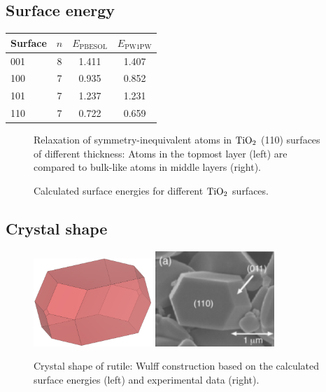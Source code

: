 \documentclass[a4paper,12pt]{scrartcl}
\begin{document}
\subsection{Surface energy}
%
\begin{table}[H]
	\centering
	\label{tab:tio2-pw1pw-compare}
	\begin{tabular}{lccc}
		\toprule
		Surface & $n$ & $ E_\mathrm{PBESOL}$ & $ E_\mathrm{PW1PW} $ \\
		\midrule
		001       & 8 & 1.411     & 1.407    \\
		100     & 7 & 0.935     & 0.852    \\
		101     & 7 & 1.237     & 1.231    \\
		110     & 7 & 0.722     & 0.659    \\
		\bottomrule
	\end{tabular}
\end{table}
%
\begin{figure}[H]
	\centering
	
	\vspace{-20pt}
	\caption{Relaxation of symmetry-inequivalent atoms in $ \ce{TiO2} $ (110) surfaces of different thickness: Atoms in the topmost layer (left) are compared to bulk-like atoms in middle layers (right).}
	\label{fig:dz}
\end{figure}
%
\begin{figure}[H]
	\centering
	
	\vspace{-20pt}
	\caption{Calculated surface energies for different $ \ce{TiO2} $ surfaces.}
	\label{fig:slab}
\end{figure}
%
\subsection{Crystal shape}
%
\begin{figure}[H]
	\centering
	\includegraphics[width=0.4\textwidth]{wulff_construction_tio2.png}
	\includegraphics[width=0.4\textwidth]{rutile_exp.png}
	\caption{Crystal shape of rutile: Wulff construction based on the calculated surface energies (left) and experimental data\autocite[]{rutile-shape} (right).}
	\label{fig:wulff}
\end{figure}
%
\newpage
\printbibliography[title={Literature}]
%
\end{document}
